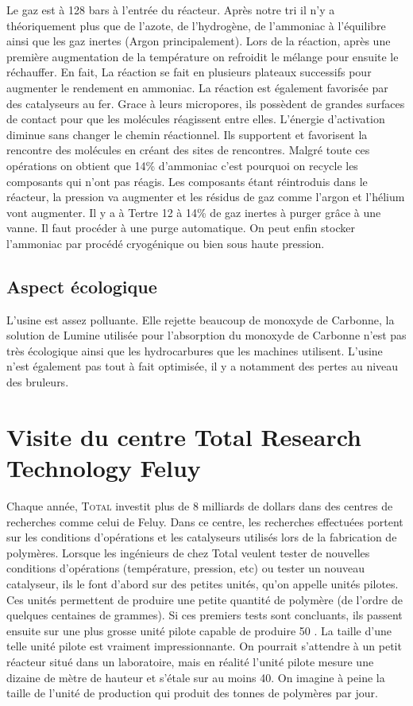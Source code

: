 Le gaz est à 128 bars à l’entrée du réacteur. Après notre tri il n’y a théoriquement plus que de l’azote, de 
l’hydrogène, de l’ammoniac à l’équilibre ainsi que les gaz inertes (Argon principalement). Lors de la réaction, après une
première augmentation de la température on refroidit le mélange pour ensuite le réchauffer. En fait, La réaction se fait en 
plusieurs plateaux successifs pour augmenter le rendement en ammoniac. La réaction est également favorisée par des catalyseurs 
au fer. Grace à leurs micropores, ils possèdent de grandes surfaces de contact pour que les molécules réagissent entre elles.
L’énergie d’activation diminue sans changer le chemin réactionnel. Ils supportent et favorisent la rencontre des molécules 
en créant des sites de rencontres.
Malgré toute ces opérations on obtient que 14\% d’ammoniac c’est pourquoi on recycle les composants qui n’ont pas réagis.  
Les composants étant réintroduis dans le réacteur, la pression va augmenter et les résidus de gaz comme l’argon et l’hélium 
vont augmenter. Il y a à Tertre 12 à 14\% de gaz inertes à purger grâce à une vanne. Il faut procéder à une purge automatique. 
On peut enfin stocker l'ammoniac par procédé cryogénique ou bien sous haute pression.


\subsection{Aspect écologique}

L’usine  est assez polluante. Elle rejette beaucoup de monoxyde de Carbonne, la solution de Lumine utilisée pour
l’absorption du monoxyde de Carbonne n’est pas très écologique ainsi que les hydrocarbures que les machines utilisent.
L’usine n’est également pas tout à fait optimisée, il y a notamment des pertes au niveau des bruleurs.


\section{Visite du centre Total Research Technology Feluy}
Chaque année, \textsc{Total} investit plus de 8 milliards de
dollars dans des centres de recherches comme celui de Feluy.
Dans ce centre, les recherches effectuées portent sur les
conditions d'opérations et les catalyseurs utilisés lors de
la fabrication de polymères. Lorsque les ingénieurs de chez
Total veulent tester de nouvelles conditions d'opérations
(température, pression, etc) ou tester un nouveau catalyseur,
ils le font d'abord sur des petites unités, qu'on appelle unités
pilotes. Ces unités permettent de produire une petite quantité
de polymère (de l'ordre de quelques centaines de grammes). Si
ces premiers tests sont concluants, ils passent ensuite sur une
plus grosse unité pilote capable de produire \unit{50}{\kilo\gram
\per\dday}. La taille d'une telle unité pilote est vraiment
impressionnante. On pourrait s'attendre à un petit réacteur situé
dans un laboratoire, mais en réalité l'unité pilote mesure une dizaine
de mètre de hauteur et s'étale sur au moins \unit{40}{\meter\squared}.
On imagine à peine la taille de l'unité de production qui produit
des tonnes de polymères par jour.

